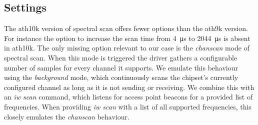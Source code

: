 \documentclass[a4paper, 11pt]{article}
\begin{document}
\subsection{Settings}
The ath10k version of spectral scan offers fewer options than the ath9k version. For instance the option to increase the scan time from \SI{4}{\micro\second} to \SI{2044}{\micro\second} is absent in ath10k. The only missing option relevant to our case is the \textit{chanscan} mode of spectral scan. When this mode is triggered the driver gathers a configurable number of samples for every channel it supports. We emulate this behaviour using the \textit{background} mode, which continuously scans the chipset's currently configured channel as long as it is not sending or receiving. We combine this with an \textit{iw scan} command, which listens for access point beacons for a provided list of frequencies. When providing \textit{iw scan} with a list of all supported frequencies, this closely emulates the \textit{chanscan} behaviour.
\label{sec:interpret}
\end{document}
